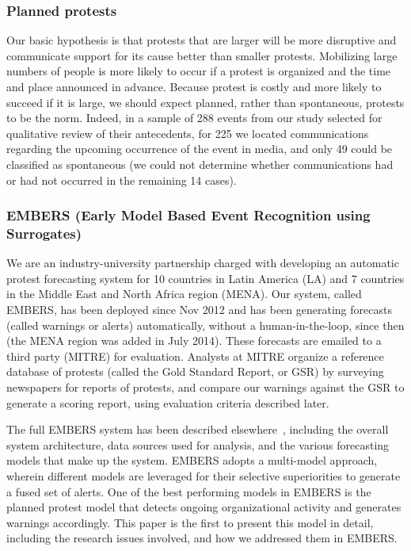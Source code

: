 \documentclass[letterpaper]{article}
\begin{document}
\subsubsection{Planned protests}
Our basic hypothesis is that protests that are larger will be more
disruptive and communicate support for its cause better than smaller
protests.  Mobilizing large numbers of people is more likely to occur if
a protest is organized and the time and place announced in advance.
Because protest is costly and more likely to succeed if it is large, we
should expect planned, rather than spontaneous, protests to be the norm.
Indeed, in a sample of 288 events from our study selected for
qualitative review of their antecedents, for 225 we located
communications regarding the upcoming occurrence of the event in media,
and only 49 could be classified as spontaneous (we could not determine
whether communications had or had not occurred in the remaining 14
cases).

\subsubsection{EMBERS (Early Model Based Event Recognition using
Surrogates)}
We are an industry-university partnership charged with developing an
automatic protest forecasting system for 10 countries in Latin America
(LA) and 7 countries in the Middle East and North Africa region (MENA).
Our system, called EMBERS, has been deployed since Nov 2012 and has been
generating forecasts (called warnings or alerts) automatically, without
a human-in-the-loop, since then (the MENA region was added in July
2014). These forecasts are emailed to a third party (MITRE) for
evaluation. Analysts at MITRE organize a reference database of protests
(called the Gold Standard Report, or GSR) by surveying newspapers for
reports of protests, and compare our warnings against the GSR to
generate a scoring report, using evaluation criteria described later.

The full EMBERS system has been described elsewhere~\cite{emberskdd,DBLP:conf/bigdataconf/DoyleKSAZLMZLBKFR14}, including
the overall system architecture, data sources used for analysis, and the
various forecasting models that make up the system. EMBERS adopts a multi-model approach,
wherein different models are leveraged for their selective superiorities
to generate a fused set of alerts. One of the
best performing models in EMBERS is the planned protest model that detects
ongoing organizational activity and generates warnings accordingly. This paper
is the first to present this model in detail, including the 
research issues involved, and how we addressed them in EMBERS.
\end{document}
